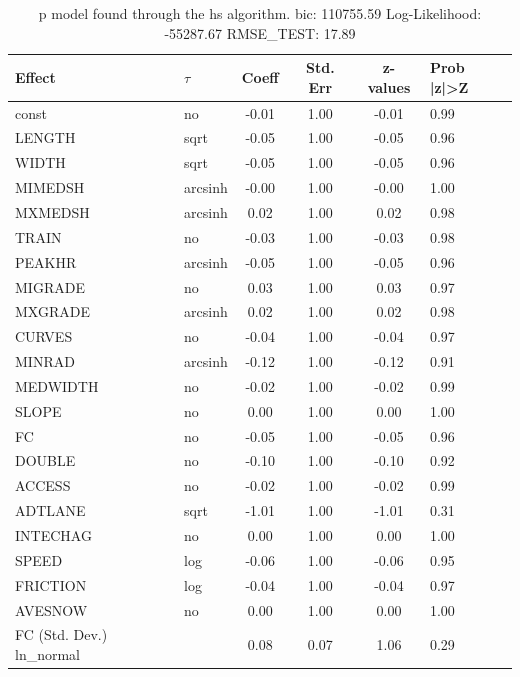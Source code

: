 \begin{table}
	\caption{p model found through the hs algorithm. bic: 110755.59 Log-Likelihood: -55287.67 RMSE_TEST: 17.89}
	\begin{center}
		\begin{tabular}{|l|l|c|c|c|l|}
			\hline
			Effect & $\tau$ & Coeff & Std. Err & z-values & Prob |z|>Z \\
			\hline
			const & no & -0.01 & 1.00 & -0.01 & 0.99 \\
			\hline
			LENGTH & sqrt & -0.05 & 1.00 & -0.05 & 0.96 \\
			\hline
			WIDTH & sqrt & -0.05 & 1.00 & -0.05 & 0.96 \\
			\hline
			MIMEDSH & arcsinh & -0.00 & 1.00 & -0.00 & 1.00 \\
			\hline
			MXMEDSH & arcsinh & 0.02 & 1.00 & 0.02 & 0.98 \\
			\hline
			TRAIN & no & -0.03 & 1.00 & -0.03 & 0.98 \\
			\hline
			PEAKHR & arcsinh & -0.05 & 1.00 & -0.05 & 0.96 \\
			\hline
			MIGRADE & no & 0.03 & 1.00 & 0.03 & 0.97 \\
			\hline
			MXGRADE & arcsinh & 0.02 & 1.00 & 0.02 & 0.98 \\
			\hline
			CURVES & no & -0.04 & 1.00 & -0.04 & 0.97 \\
			\hline
			MINRAD & arcsinh & -0.12 & 1.00 & -0.12 & 0.91 \\
			\hline
			MEDWIDTH & no & -0.02 & 1.00 & -0.02 & 0.99 \\
			\hline
			SLOPE & no & 0.00 & 1.00 & 0.00 & 1.00 \\
			\hline
			FC & no & -0.05 & 1.00 & -0.05 & 0.96 \\
			\hline
			DOUBLE & no & -0.10 & 1.00 & -0.10 & 0.92 \\
			\hline
			ACCESS & no & -0.02 & 1.00 & -0.02 & 0.99 \\
			\hline
			ADTLANE & sqrt & -1.01 & 1.00 & -1.01 & 0.31 \\
			\hline
			INTECHAG & no & 0.00 & 1.00 & 0.00 & 1.00 \\
			\hline
			SPEED & log & -0.06 & 1.00 & -0.06 & 0.95 \\
			\hline
			FRICTION & log & -0.04 & 1.00 & -0.04 & 0.97 \\
			\hline
			AVESNOW & no & 0.00 & 1.00 & 0.00 & 1.00 \\
			\hline
			FC (Std. Dev.) ln_normal &  & 0.08 & 0.07 & 1.06 & 0.29 \\

\end{tabular}
\end{center}
\end{table}
